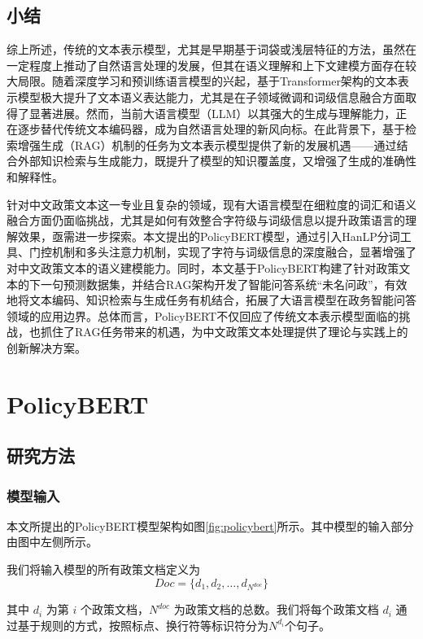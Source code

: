\documentclass[12pt, a4paper]{ctexart}
\begin{document}
\subsection{小结}

综上所述，传统的文本表示模型，尤其是早期基于词袋或浅层特征的方法，虽然在一定程度上推动了自然语言处理的发展，但其在语义理解和上下文建模方面存在较大局限。随着深度学习和预训练语言模型的兴起，基于Transformer架构的文本表示模型极大提升了文本语义表达能力，尤其是在子领域微调和词级信息融合方面取得了显著进展。然而，当前大语言模型（LLM）以其强大的生成与理解能力，正在逐步替代传统文本编码器，成为自然语言处理的新风向标。在此背景下，基于检索增强生成（RAG）机制的任务为文本表示模型提供了新的发展机遇——通过结合外部知识检索与生成能力，既提升了模型的知识覆盖度，又增强了生成的准确性和解释性。

针对中文政策文本这一专业且复杂的领域，现有大语言模型在细粒度的词汇和语义融合方面仍面临挑战，尤其是如何有效整合字符级与词级信息以提升政策语言的理解效果，亟需进一步探索。本文提出的PolicyBERT模型，通过引入HanLP分词工具、门控机制和多头注意力机制，实现了字符与词级信息的深度融合，显著增强了对中文政策文本的语义建模能力。同时，本文基于PolicyBERT构建了针对政策文本的下一句预测数据集，并结合RAG架构开发了智能问答系统“未名问政”，有效地将文本编码、知识检索与生成任务有机结合，拓展了大语言模型在政务智能问答领域的应用边界。总体而言，PolicyBERT不仅回应了传统文本表示模型面临的挑战，也抓住了RAG任务带来的机遇，为中文政策文本处理提供了理论与实践上的创新解决方案。

\section{PolicyBERT}
\subsection{研究方法}

\subsubsection{模型输入}
本文所提出的PolicyBERT模型架构如图\ref{fig:policybert}所示。其中模型的输入部分由图中左侧所示。

我们将输入模型的所有政策文档定义为 
\begin{equation}
    Doc = \{d_1, d_2, \dots, d_{N^{doc}}\} 
\end{equation}

其中 $d_i$ 为第 $i$ 个政策文档，${N^{doc}}$ 为政策文档的总数。我们将每个政策文档 $d_i$ 通过基于规则的方式，按照标点、换行符等标识符分为$N^{d_i}$个句子。 
\end{document}
